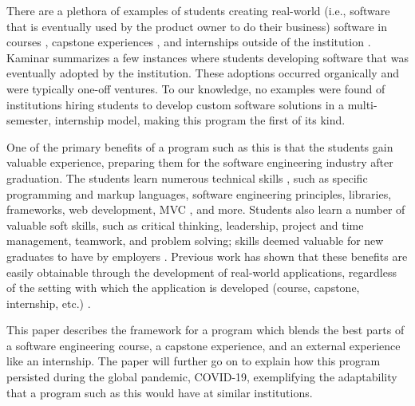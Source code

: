 There are a plethora of examples of students creating real-world (i.e., software that is eventually used by the product owner to do their business) software in courses \cite{coursevsproject, tadayon2004software}, capstone experiences \cite{keogh2007scalable, capstone}, and internships outside of the institution \cite{rochesterfirstundergradsoftwareteam}. Kaminar \cite{kaminer_2014} summarizes a few instances where students developing software that was eventually adopted by the institution. These adoptions occurred organically and were typically one-off ventures. To our knowledge, no examples were found of institutions hiring students to develop custom software solutions in a multi-semester, internship model, making this program the first of its kind.

One of the primary benefits of a program such as this is that the students gain valuable experience, preparing them for the software engineering industry after graduation. The students learn numerous technical skills \cite{hardskills}, such as specific programming and markup languages, software engineering principles, libraries, frameworks, web development, MVC \cite{mvc}, and more. Students also learn a number of valuable soft skills, such as critical thinking, leadership, project and time management, teamwork, and problem solving; skills deemed valuable for new graduates to have by employers \cite{lavy2013soft}. Previous work has shown that these benefits are easily obtainable through the development of real-world applications, regardless of the setting with which the application is developed (course, capstone, internship, etc.) \cite{heggen2018hiring, liu2005enriching, alzamil2005towards}.

This paper describes the framework for a program which blends the best parts of a software engineering course, a capstone experience, and an external experience like an internship. The paper will further go on to explain how this program persisted during the global pandemic, COVID-19, exemplifying the adaptability that a program such as this would have at similar institutions.

